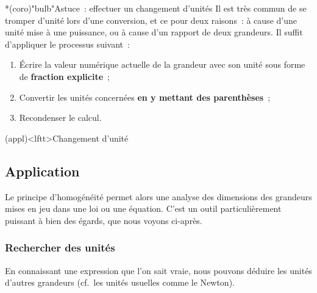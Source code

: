 \documentclass[../../main/main.tex]{subfiles}
\begin{document}
\begin{tcb}*(coro)"bulb"{Astuce~: effectuer un changement d'unités}
	Il est très commun de se tromper d'unité lors d'une conversion, et ce pour
	deux raisons~: à cause d'une unité mise à une puissance, ou à cause d'un
	rapport de deux grandeurs. Il suffit d'appliquer le processus suivant~:
	\begin{enumerate}
		\item Écrire la valeur numérique actuelle de la grandeur avec son unité sous
		      forme de \textbf{fraction explicite}~;
		\item Convertir les unités concernées \textbf{en y mettant des
			      parenthèses}~;
		\item Recondenser le calcul.
	\end{enumerate}
\end{tcb}

\begin{tcb*}[sidebyside, lefthand ratio=.55](appl)<lftt>{Changement d'unité}
	\vspace*{-10pt}
	\vspace*{-10pt}
	\tcblower
	\vspace*{-10pt}
\end{tcb*}

\subsection{Application}

Le principe d'homogénéité permet alors une analyse des dimensions des grandeurs
mises en jeu dans une loi ou une équation. C'est un outil particulièrement
puissant à bien des égards, que nous voyons ci-après.

\subsubsection{Rechercher des unités}

En connaissant une expression que l'on sait vraie, nous pouvons déduire les
unités d'autres grandeurs (cf.\ les unités usuelles comme le Newton).
\end{document}
